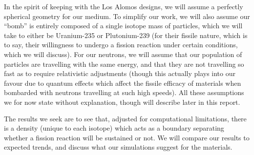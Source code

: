 In the spirit of keeping with the Los Alomos designs, we will assume a perfectly spherical geometry for our medium. 
To simplify our work, we will also assume our ``bomb'' is entirely composed of a single isotope mass of particles, which 
we will take to either be Uranium-235 or Plutonium-239 (for their fissile nature, which is to say, their willingness 
to undergo a fission reaction under certain conditions, which we will discuss). For our neutrons, we will assume that 
our population of particles are travelling with the same energy, and that they are not travelling so fast as to require relativistic 
adjustments (though this actually plays into our favour due to quantum effects which affect the fissile efficacy of materials 
when bombarded with neutrons travelling at such high speeds). All these assumptions we for now state without explanation, though 
will describe later in this report.

The results we seek are to see that, adjusted for computational limitations, there is a density (unique to each isotope) 
which acts as a boundary separating whether a fission reaction will be sustained or not. We will compare our results 
to expected trends, and discuss what our simulations suggest for the materials.